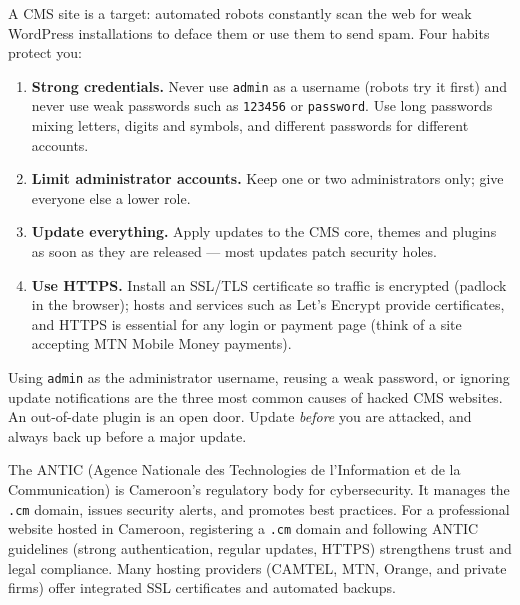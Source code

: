 \documentclass[11pt]{article}
\newcommand{\cle}[1]{{\popxbold\color{popdark}#1}}
\newcounter{popsec}
\newcounter{popsub}
\newcommand{\courssub}[1]{%
  \stepcounter{popsub}%
  \par\vspace{9pt}\noindent{\popxbold\fontsize{11.5}{13}\selectfont\color{popink}{\color{poporange}\thepopsec.\thepopsub}\hspace{6pt}#1}\par\nopagebreak\vspace{4pt}
}
\begin{document}
\courssub{Security Basics}

A CMS site is a target: automated robots constantly scan the web for weak WordPress installations to deface them or use them to send spam. Four habits protect you:

\begin{enumerate}
\item \textbf{Strong credentials.} Never use \texttt{admin} as a username (robots try it first) and never use weak passwords such as \texttt{123456} or \texttt{password}. Use long passwords mixing letters, digits and symbols, and different passwords for different accounts.
\item \textbf{Limit administrator accounts.} Keep one or two administrators only; give everyone else a lower role.
\item \textbf{Update everything.} Apply updates to the CMS core, themes and plugins as soon as they are released — most updates patch security holes.
\item \textbf{Use HTTPS.} Install an SSL/TLS certificate so traffic is encrypted (padlock in the browser); hosts and services such as Let's Encrypt provide certificates, and HTTPS is essential for any login or payment page (think of a site accepting MTN Mobile Money payments).
\end{enumerate}

\begin{attention}
Using \texttt{admin} as the administrator username, reusing a weak password, or ignoring update notifications are the three most common causes of hacked CMS websites. An out-of-date plugin is an open door. Update \emph{before} you are attacked, and always back up before a major update.
\end{attention}

\begin{savaistu}
The \cle{ANTIC} (Agence Nationale des Technologies de l'Information et de la Communication) is Cameroon's regulatory body for cybersecurity. It manages the \texttt{.cm} domain, issues security alerts, and promotes best practices. For a professional website hosted in Cameroon, registering a \texttt{.cm} domain and following ANTIC guidelines (strong authentication, regular updates, HTTPS) strengthens trust and legal compliance. Many hosting providers (CAMTEL, MTN, Orange, and private firms) offer integrated SSL certificates and automated backups.
\end{savaistu}
\end{document}
